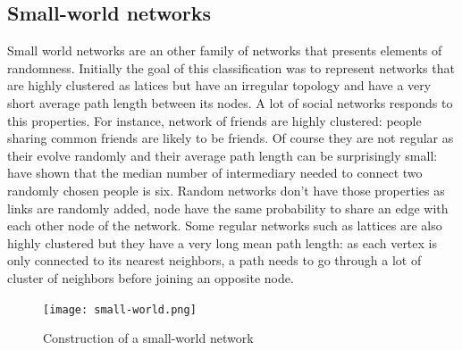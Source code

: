 \documentclass[a4paper, 12pt]{report}
\begin{document}
\subsection{Small-world networks}
\label{sm-section}
Small world networks are an other family of networks that presents elements of randomness. Initially the goal of this classification was to represent networks that are highly clustered as latices but have an irregular topology and have a very short average path length between its nodes. A lot of social networks responds to this properties. For instance, network of friends are highly clustered: people sharing common friends are likely to be friends. Of course they are not regular as their evolve randomly and their average path length can be surprisingly small: \cite{milgram} have shown that the median number of intermediary needed to connect two randomly chosen people is six. Random networks don't have those properties as links are randomly added, node have the same probability to share an edge with each other node of the network. Some regular networks such as lattices are also highly clustered but they have a very long mean path length: as each vertex is only connected to its nearest neighbors, a path needs to go through a lot of cluster of neighbors before joining an opposite node. \citep{complex_networks} \\

\begin{figure}
\centering
\texttt{[image: small-world.png]}
\caption{Construction of a small-world network \citep{small-world}}
\label{small-world_pictures}
\end{figure}
\end{document}
